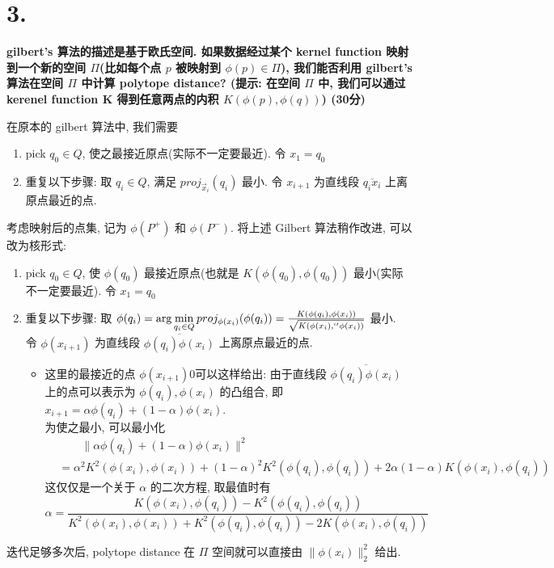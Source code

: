 \documentclass[UTF8]{article}
\newcommand{\jumpLine} {\hspace*{\fill} \par}
\begin{document}
\section*{3.}
\noindent \textbf{gilbert's 算法的描述是基于欧氏空间. 如果数据经过某个 kernel function 映射到一个新的空间 $\Pi$(比如每个点 $p$ 被映射到 $\phi(p)\in\Pi$), 我们能否利用 gilbert's 算法在空间 $\Pi$ 中计算 polytope distance? (提示: 在空间 $\Pi$ 中, 我们可以通过 kerenel function K 得到任意两点的内积 $K(\phi(p), \phi(q))$) (30分)} \\\jumpLine\noindent
在原本的 gilbert 算法中, 我们需要
\begin{enumerate}
	\item pick $q_0 \in Q$, 使之最接近原点(实际不一定要最近). 令 $x_1 = q_0$
	\item 重复以下步骤: 取 $q_i \in Q$, 满足 $proj_{\vec{x}_i}(q_i)$ 最小. 令 $x_{i+1}$ 为直线段 $\overline{q_i x_i}$ 上离原点最近的点. 
\end{enumerate}
考虑映射后的点集, 记为 $\phi(P^+)$ 和 $\phi(P^-)$. 将上述 Gilbert 算法稍作改进, 可以改为核形式:
\begin{enumerate}
	\item pick $q_0 \in Q$, 使 $\phi(q_0)$ 最接近原点(也就是 $K(\phi(q_0), \phi(q_0))$ 最小(实际不一定要最近). 令 $x_1 = q_0$
	\item 重复以下步骤: 取 $\phi(q_i) =\arg\min\limits_{q_i \in Q} proj_{\phi({x}_i)}(\phi(q_i))=\frac{K(\phi(q_i), \phi(x_i))}{\sqrt{K(\phi(x_i), `'\phi(x_i))}}$ 最小.  \\
	令 $\phi(x_{i+1})$ 为直线段 $\overline{\phi(q_i) \phi(x_i)}$ 上离原点最近的点. 
	\begin{itemize}
		\item 这里的最接近的点 $\phi(x_{i+1})0$可以这样给出: 由于直线段 $\overline{\phi(q_i) \phi(x_i)}$ 上的点可以表示为 $\phi(q_i), \phi(x_i)$ 的凸组合, 即 $x_{i+1}=\alpha\phi(q_i) + (1-\alpha) \phi(x_i)$. \\
		为使之最小, 可以最小化
		\begin{align*}
			&\qquad\|\alpha\phi(q_i) + (1-\alpha) \phi(x_i)\|^2 \\
			&=\alpha^2 K^2(\phi(x_i), \phi(x_i)) + (1-\alpha)^2 K^2(\phi(q_i), \phi(q_i)) + 2\alpha(1-\alpha)K(\phi(x_i), \phi(q_i))
		\end{align*}
		这仅仅是一个关于 $\alpha$ 的二次方程, 取最值时有
		$$\alpha=\frac{K(\phi(x_i), \phi(q_i)) - K^2(\phi(q_i), \phi(q_i))}{K^2(\phi(x_i), \phi(x_i)) + K^2(\phi(q_i), \phi(q_i)) - 2K(\phi(x_i), \phi(q_i))}$$
	\end{itemize}
\end{enumerate}
迭代足够多次后, polytope distance 在 $\Pi$ 空间就可以直接由 $\|\phi(x_i)\|_2^2$ 给出.
\end{document}
